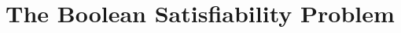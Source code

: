 \documentclass[12pt,openany]{book}
\begin{document}

\tableofcontents
\newpage



\chapter{The Boolean Satisfiability Problem}


\end{document}
